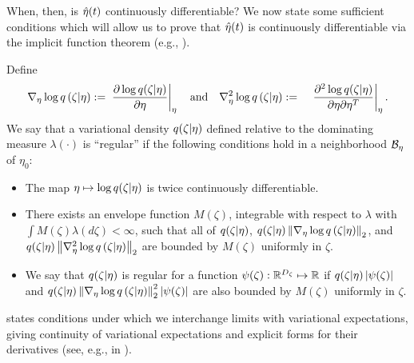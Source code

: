 When, then, is $\hat\eta(t)$ continuously differentiable?  We now state some
sufficient conditions which will allow us to prove that $\hat\eta(t)$ is
continuously differentiable via the implicit function theorem
(e.g., \citet{krantz:2012:implicit}).

\begin{assu}
%
Define
%
\begin{align*}
%
\lqgrad{\zeta \vert \eta} :={}&
    \fracat{\partial \log \q(\zeta \vert \eta)}{\partial \eta}{\eta}
    \mathtxt{and}
%
\lqhess{\zeta \vert \eta} :={}&
    \fracat{\partial^2 \log \q(\zeta \vert \eta)}
           {\partial \eta \partial \eta^T}{\eta}.
%
\end{align*}
%
We say that a variational density $q(\zeta \vert \eta)$ defined relative to the
dominating measure $\lambda(\cdot)$ is ``regular'' if the following conditions
hold in a neighborhood $\mathcal{B}_\eta$ of $\eta_0$:
%
\begin{itemize}
%
\item  The map $\eta \mapsto \log q(\zeta \vert \eta)$ is twice continuously
differentiable.
%
\item  There exists an envelope function $M(\zeta)$, integrable with respect to
$\lambda$ with $\int M(\zeta) \lambda(d\zeta) < \infty$, such that all of
$q(\zeta \vert \eta)$, $q(\zeta \vert \eta) \left\Vert{\nabla_\eta \log q}\left(\zeta \vert
\eta\right)\right\Vert_2$, and $q(\zeta \vert \eta) \left\Vert{\nabla_\eta^2 \log q}\left(\zeta \vert \eta\right)\right\Vert_2$ are
bounded by $M(\zeta)$ uniformly in $\zeta$.
%
\item {} We say that $q(\zeta \vert \eta)$ is regular
for a function $\psi(\zeta): \mathbb{R}^{D_{\zeta}} \mapsto \mathbb{R}$ if
$q(\zeta \vert \eta) \left|\psi(\zeta)\right|$ and $q(\zeta \vert \eta)
\left\Vert{\nabla_\eta \log q}\left(\zeta \vert \eta\right)\right\Vert_2^2 \left|\psi(\zeta)\right|$ are also bounded by
$M(\zeta)$ uniformly in $\zeta$.
%
\end{itemize}
%
%
\end{assu}
%

 states conditions under which we interchange limits with
variational  expectations, giving continuity of variational expectations and
explicit forms for their derivatives (see, e.g.,  in ).


